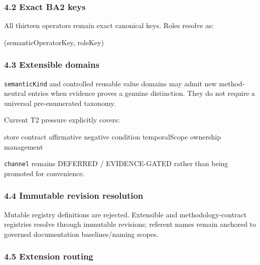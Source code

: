 \documentclass[
  10pt,
  a4paper,
]{article}
\newenvironment{Shaded}{}{}
\newcommand{\NormalTok}[1]{#1}
\begin{document}
\subsubsection{4.2 Exact BA2 keys}\label{exact-ba2-keys}

All thirteen operators remain exact canonical keys. Roles resolve as:

\begin{Shaded}
\begin{Highlighting}[]
\NormalTok{(semanticOperatorKey, roleKey)}
\end{Highlighting}
\end{Shaded}

\subsubsection{4.3 Extensible domains}\label{extensible-domains}

\texttt{semanticKind} and controlled reusable value domains may admit
new method-neutral entries when evidence proves a genuine distinction.
They do not require a universal pre-enumerated taxonomy.

Current T2 pressure explicitly covers:

\begin{Shaded}
\begin{Highlighting}[]
\NormalTok{store  contract}
\NormalTok{affirmative  negative}
\NormalTok{condition  temporalScope}
\NormalTok{ownership  management}
\end{Highlighting}
\end{Shaded}

\texttt{channel} remains DEFERRED / EVIDENCE-GATED rather than being
promoted for convenience.

\subsubsection{4.4 Immutable revision
resolution}\label{immutable-revision-resolution}

Mutable registry definitions are rejected. Extensible and
methodology-contract registries resolve through immutable revisions;
referent names remain anchored to governed documentation
baselines/naming scopes.

\subsubsection{4.5 Extension routing}\label{extension-routing}
\end{document}
